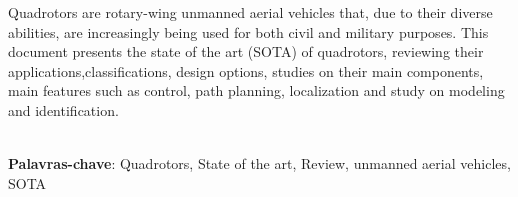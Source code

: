 \begin{thesisabastract}
    Quadrotors are rotary-wing unmanned aerial vehicles that, due to their diverse abilities, are increasingly being used for both civil and military purposes. This document presents the state of the art (SOTA) of quadrotors, reviewing their applications,classifications, design options, studies on their main components, main features such as control, path planning, localization and study on modeling and identification.

\ \\


\textbf{Palavras-chave}: Quadrotors, State of the art, Review, unmanned aerial vehicles, SOTA

\end{thesisabastract}
